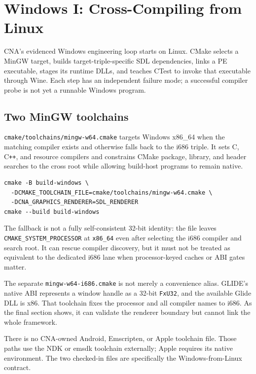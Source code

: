 \chapter{Windows I: Cross-Compiling from Linux}
\label{ch:windows-cross-compiling}
\label{ch:windows-wine}

CNA's evidenced Windows engineering loop starts on Linux. CMake selects a MinGW target,
builds target-triple-specific SDL dependencies, links a PE executable, stages its runtime
DLLs, and teaches CTest to invoke that executable through Wine. Each step has an independent
failure mode; a successful compiler probe is not yet a runnable Windows program.

\section{Two MinGW toolchains}

\texttt{cmake/toolchains/mingw-w64.cmake} targets Windows x86\_64 when the matching compiler
exists and otherwise falls back to the i686 triple. It sets C, C\texttt{++}, and resource
compilers and constrains CMake package, library, and header searches to the cross root while
allowing build-host programs to remain native.

\begin{lstlisting}[style=cnashell]
cmake -B build-windows \
  -DCMAKE_TOOLCHAIN_FILE=cmake/toolchains/mingw-w64.cmake \
  -DCNA_GRAPHICS_RENDERER=SDL_RENDERER
cmake --build build-windows
\end{lstlisting}

The fallback is not a fully self-consistent 32-bit identity: the file leaves
\texttt{CMAKE\_SYSTEM\_PROCESSOR} at \texttt{x86\_64} even after selecting the i686 compiler
and search root. It can rescue compiler discovery, but it must not be treated as equivalent to
the dedicated i686 lane when processor-keyed caches or ABI gates matter.

The separate \texttt{mingw-w64-i686.cmake} is not merely a convenience alias. GLIDE's native
ABI represents a window handle as a 32-bit \texttt{FxU32}, and the available Glide DLL is x86.
That toolchain fixes the processor and all compiler names to i686. As the final section shows,
it can validate the renderer boundary but cannot link the whole framework.

There is no CNA-owned Android, Emscripten, or Apple toolchain file. Those paths use the NDK or
emsdk toolchain externally; Apple requires its native environment. The two checked-in files are
specifically the Windows-from-Linux contract.

